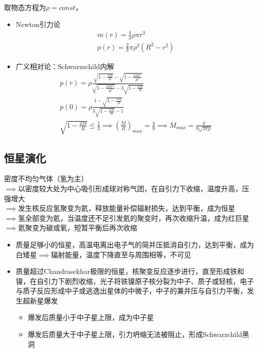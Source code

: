 取物态方程为$\rho=const$，
\begin{itemize}
    \item Newton引力论
    \begin{gather*}
        m(r)=\frac{4}{3}\rho \pi r^3
        \\
        p(r)=\frac{2}{3}\pi \rho^2(R^2-r^2)
    \end{gather*}
    \item 广义相对论：Schwarzschild内解
    \begin{gather*}
        p(r)=\rho \frac{\sqrt{1-\frac{2M}{R}}-\sqrt{1-\frac{2Mr^2}{R^3}}}{\sqrt{1-\frac{2Mr^2}{R^3}}-3\sqrt{1-\frac{2M}{R}}}
        \\
        p(0)=\rho \frac{1-\sqrt{1-\frac{2M}{R}}}{3\sqrt{1-\frac{2M}{R}}-1}
        \\
        \sqrt{1-\frac{2M}{R}} \leq \frac{1}{3} \implies \left(\frac{M}{R}\right)_{max}=\frac{4}{9} \implies M_{max}=\frac{4}{9\sqrt{3\pi \rho}}
    \end{gather*}
\end{itemize}

\subsection{恒星演化}

密度不均匀气体（氢为主）\\
$\implies$以密度较大处为中心吸引形成球对称气团，在自引力下收缩，温度升高，压强增大\\
$\implies$发生核反应氢聚变为氦，释放能量补偿辐射损失，达到平衡，成为恒星\\
$\implies$氢全部变为氦，当温度还不足引发氦的聚变时，再次收缩升温，成为红巨星\\
$\implies$氦聚变为碳或氧，短暂平衡后再次收缩\\
\begin{itemize}
    \item 质量足够小的恒星，高温电离出电子气的简并压抵消自引力，达到平衡，成为白矮星$\implies$辐射能量，温度下降直至与周围相等，不可见
    \item 质量超过Chandrasekhar极限的恒星，核聚变反应逐步进行，直至形成铁和镍，在自引力下剧烈收缩，光子将铁镍原子核分裂为中子、质子或轻核，电子与质子反应形成中子或逃逸出星体的中微子，中子的兼并压与自引力平衡，发生超新星爆发
    \begin{itemize}
        \item 爆发后质量小于中子星上限，成为中子星
        \item 爆发后质量大于中子星上限，引力坍缩无法被阻止，形成Schwarzchild黑洞
    \end{itemize}
\end{itemize}

